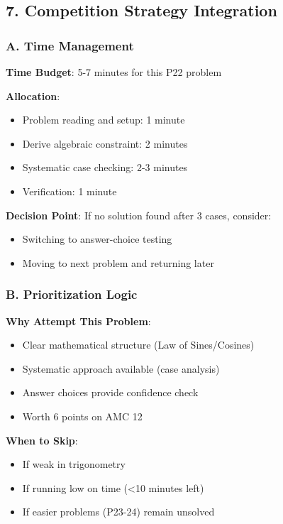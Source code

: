 \documentclass[12pt]{article}
\begin{document}
\begin{competitionbox}
\subsection*{7. Competition Strategy Integration}

\subsubsection*{A. Time Management}

\textbf{Time Budget}: 5-7 minutes for this P22 problem

\textbf{Allocation}:
\begin{itemize}
    \item Problem reading and setup: 1 minute
    \item Derive algebraic constraint: 2 minutes  
    \item Systematic case checking: 2-3 minutes
    \item Verification: 1 minute
\end{itemize}

\textbf{Decision Point}: If no solution found after 3 cases, consider:
\begin{itemize}
    \item Switching to answer-choice testing
    \item Moving to next problem and returning later
\end{itemize}

\subsubsection*{B. Prioritization Logic}

\textbf{Why Attempt This Problem}:
\begin{itemize}
    \item Clear mathematical structure (Law of Sines/Cosines)
    \item Systematic approach available (case analysis)
    \item Answer choices provide confidence check
    \item Worth 6 points on AMC 12
\end{itemize}

\textbf{When to Skip}:
\begin{itemize}
    \item If weak in trigonometry
    \item If running low on time (<10 minutes left)
    \item If easier problems (P23-24) remain unsolved
\end{itemize}


\end{competitionbox}
\end{document}
